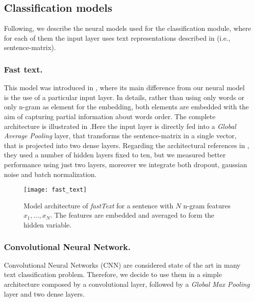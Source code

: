 \subsection{Classification models} \label{subsec:classificationModel}
Following, we describe the neural models used for the classification module, where for each of them the input layer uses text representations described in  (i.e., sentence-matrix).


\subsubsection{Fast text.}
This model was introduced in \cite{joulin2016bag}, where its main difference from our neural model is the use of a particular input layer. In details, rather than using only words or only n-gram as element for the embedding, both elements are embedded with the aim of capturing partial information about words order.
The complete architecture is illustrated in .Here the input layer is directly fed into a \emph{Global Average Pooling} layer, that transforms the sentence-matrix in a single vector, that is projected into two dense layers.
Regarding the architectural references in \cite{joulin2016bag}, they used a number of hidden layers fixed to ten, but we measured better performance using just two layers, moreover we integrate both dropout, gaussian noise and batch normalization.

\begin{figure}[h]
\footnotesize
\centering
\texttt{[image: fast\_text]}
\caption{\cite{joulin2016bag} Model architecture of \emph{fastText} for a sentence with $N$ n-gram features $x_1,\dots,x_N$. The features are embedded and averaged to form the hidden variable.}
\label{fig:fastText}
\end{figure}


\subsubsection{Convolutional Neural Network.}
Convolutional Neural Networks (CNN) are considered state of the art in many text classification problem. Therefore, we decide to use them in a simple architecture composed by a convolutional layer, followed by a \emph{Global Max Pooling} layer and two dense layers.

